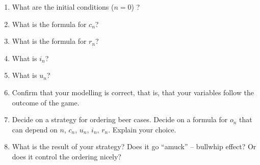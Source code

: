 \begin{enumerate}[label = \emph{(\alph*)}]
\item What are the initial conditions ($n=0$) ?
\item What is the formula for $c_n$?


\item What is the formula for $r_n$? 


\item What is $i_n$?

\item What is $u_n$?


\item Confirm that your modelling is correct, that is, that your variables follow the outcome of the game.

\item Decide on a strategy for ordering beer cases. Decide on a formula for $o_n$ that can depend on $n$, $c_n$, $u_n$, $i_n$, $r_n$.
Explain your choice.


\item What is the result of your strategy? Does it go ``amuck'' -- bullwhip effect? Or does it control the ordering nicely?

\end{enumerate}




\vfill


